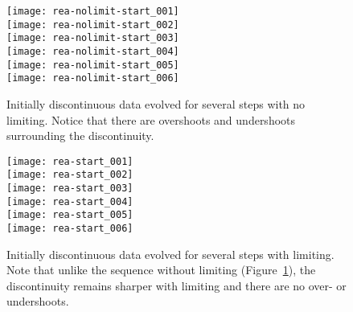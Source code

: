 \begin{figure}[h]
\centering
\texttt{[image: rea-nolimit-start\_001]} \\
\texttt{[image: rea-nolimit-start\_002]} \\
\texttt{[image: rea-nolimit-start\_003]} \\
\texttt{[image: rea-nolimit-start\_004]} \\
\texttt{[image: rea-nolimit-start\_005]} \\
\texttt{[image: rea-nolimit-start\_006]}
\caption[The effect of no limiting on initially discontinuous data]{\label{fig:limitingex}Initially discontinuous data evolved for several steps with
  no limiting.  Notice that there are overshoots and undershoots
  surrounding the discontinuity.}
\end{figure}

\begin{figure}[h]
\centering
\texttt{[image: rea-start\_001]} \\
\texttt{[image: rea-start\_002]} \\
\texttt{[image: rea-start\_003]} \\
\texttt{[image: rea-start\_004]} \\
\texttt{[image: rea-start\_005]} \\
\texttt{[image: rea-start\_006]}
\caption[The effect of limiters on initially discontinuous
  data]{\label{fig:limitingexb}Initially discontinuous data evolved
  for several steps with limiting.  Note that unlike the sequence
  without limiting (Figure~\ref{fig:limitingex}), the
  discontinuity remains sharper with limiting and there are no over-
  or undershoots.}
\end{figure}

